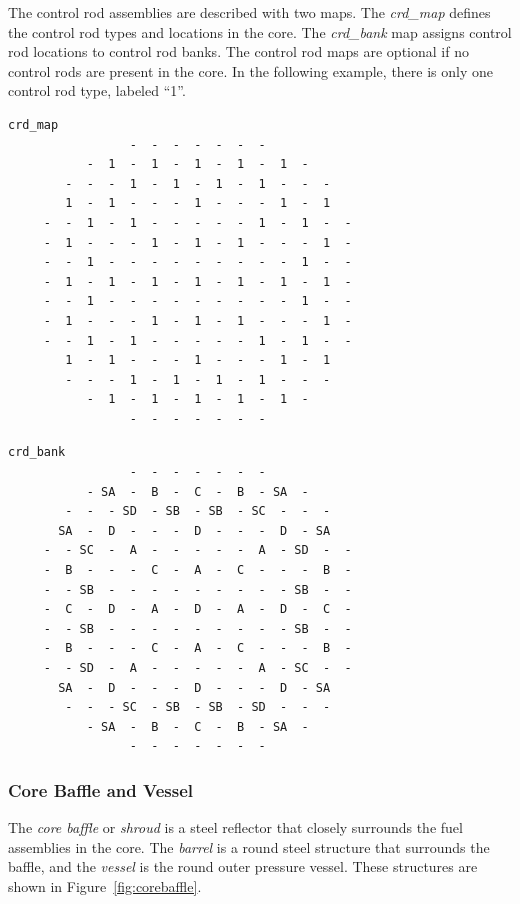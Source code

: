 The control rod assemblies are described with two maps. The {\it crd\_map}
defines the control rod types and locations in the core.
The {\it crd\_bank} map assigns control rod locations to control rod banks.
The control rod maps are optional if no control rods are present in the core.
In the following example, there is only one control rod type, labeled ``1''.

\begin{Verbatim}[fontsize=\small]
  crd_map
                 -  -  -  -  -  -  -
           -  1  -  1  -  1  -  1  -  1  -
        -  -  -  1  -  1  -  1  -  1  -  -  -
        1  -  1  -  -  -  1  -  -  -  1  -  1
     -  -  1  -  1  -  -  -  -  -  1  -  1  -  -
     -  1  -  -  -  1  -  1  -  1  -  -  -  1  -
     -  -  1  -  -  -  -  -  -  -  -  -  1  -  -
     -  1  -  1  -  1  -  1  -  1  -  1  -  1  -
     -  -  1  -  -  -  -  -  -  -  -  -  1  -  -
     -  1  -  -  -  1  -  1  -  1  -  -  -  1  -
     -  -  1  -  1  -  -  -  -  -  1  -  1  -  -
        1  -  1  -  -  -  1  -  -  -  1  -  1
        -  -  -  1  -  1  -  1  -  1  -  -  -
           -  1  -  1  -  1  -  1  -  1  -
                 -  -  -  -  -  -  -
\end{Verbatim}
\vfill   %
\begin{Verbatim}[fontsize=\small]
  crd_bank
                 -  -  -  -  -  -  -
           - SA  -  B  -  C  -  B  - SA  -
        -  -  - SD  - SB  - SB  - SC  -  -  -
       SA  -  D  -  -  -  D  -  -  -  D  - SA
     -  - SC  -  A  -  -  -  -  -  A  - SD  -  -
     -  B  -  -  -  C  -  A  -  C  -  -  -  B  -
     -  - SB  -  -  -  -  -  -  -  -  - SB  -  -
     -  C  -  D  -  A  -  D  -  A  -  D  -  C  -
     -  - SB  -  -  -  -  -  -  -  -  - SB  -  -
     -  B  -  -  -  C  -  A  -  C  -  -  -  B  -
     -  - SD  -  A  -  -  -  -  -  A  - SC  -  -
       SA  -  D  -  -  -  D  -  -  -  D  - SA
        -  -  - SC  - SB  - SB  - SD  -  -  -
           - SA  -  B  -  C  -  B  - SA  -
                 -  -  -  -  -  -  -

\end{Verbatim}

\subsubsection{Core Baffle and Vessel}

The \textit{core baffle} or \textit{shroud} is a steel reflector that closely surrounds
the fuel assemblies in the core. The \textit{barrel} is a round steel structure that surrounds the baffle, and
the \textit{vessel} is the round outer pressure vessel. These structures are shown in
Figure~\ref{fig:corebaffle}.

